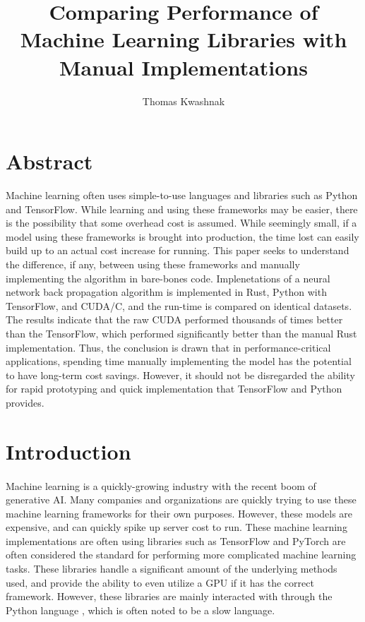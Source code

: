 \documentclass[12pt]{article}
\author{Thomas Kwashnak}
\title{Comparing Performance of Machine Learning Libraries with Manual Implementations}
\newcommand{\CC}{C\nolinebreak\hspace{-.05em}\raisebox{.4ex}{\tiny\bf +}\nolinebreak\hspace{-.10em}\raisebox{.4ex}{\tiny\bf + }}
\begin{document}
\maketitle

\newpage

\section{Abstract}

Machine learning often uses simple-to-use languages and libraries such as Python and TensorFlow.
While learning and using these frameworks may be easier, there is the possibility that some overhead cost is assumed.
While seemingly small, if a model using these frameworks is brought into production, the time lost can easily build up to an actual cost increase for running.
This paper seeks to understand the difference, if any, between using these frameworks and manually implementing the algorithm in bare-bones code.
Implenetations of a neural network back propagation algorithm is implemented in Rust, Python with TensorFlow, and CUDA/\CC, and the run-time is compared on identical datasets.
The results indicate that the raw CUDA performed thousands of times better than the TensorFlow, which performed significantly better than the manual Rust implementation.
Thus, the conclusion is drawn that in performance-critical applications, spending time manually implementing the model has the potential to have long-term cost savings.
However, it should not be disregarded the ability for rapid prototyping and quick implementation that TensorFlow and Python provides.


\section{Introduction}

\paragraph{}
Machine learning is a quickly-growing industry with the recent boom of generative AI.
Many companies and organizations are quickly trying to use these machine learning frameworks for their own purposes.
However, these models are expensive, and can quickly spike up server cost to run.
These machine learning implementations are often using libraries such as TensorFlow \cite{lib_tensorflow} and PyTorch \cite{lib_pytorch} are often considered the standard for performing more complicated machine learning tasks.
These libraries handle a significant amount of the underlying methods used, and provide the ability to even utilize a GPU if it has the correct framework.
However, these libraries are mainly interacted with through the Python language \cite{lang_python}, which is often noted to be a slow language.
\end{document}
